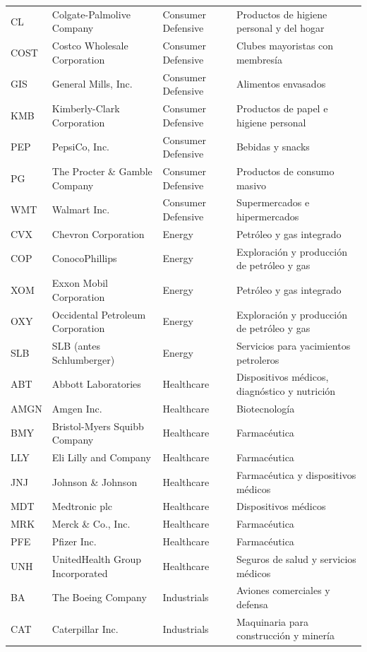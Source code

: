 \documentclass[12pt,letterpaper,oneside]{report}
\renewcommand{\_}{\UnderscoreOriginal\allowbreak}
\begin{document}
{\begin{longtable}{@{}l>{\raggedright}p{4.1cm}>{\raggedright}p{3.1cm}>{\raggedright\arraybackslash}p{5.3cm}@{}}
CL & Colgate-Palmolive Company & Consumer Defensive & Productos de higiene personal y del hogar \\
COST & Costco Wholesale Corporation & Consumer Defensive & Clubes mayoristas con membresía \\
GIS & General Mills, Inc. & Consumer Defensive & Alimentos envasados \\
KMB & Kimberly-Clark Corporation & Consumer Defensive & Productos de papel e higiene personal \\
PEP & PepsiCo, Inc. & Consumer Defensive & Bebidas y snacks \\
PG & The Procter \& Gamble Company & Consumer Defensive & Productos de consumo masivo \\
WMT & Walmart Inc. & Consumer Defensive & Supermercados e hipermercados \\
CVX & Chevron Corporation & Energy & Petróleo y gas integrado \\
COP & ConocoPhillips & Energy & Exploración y producción de petróleo y gas \\
XOM & Exxon Mobil Corporation & Energy & Petróleo y gas integrado \\
OXY & Occidental Petroleum Corporation & Energy & Exploración y producción de petróleo y gas \\
SLB & SLB (antes Schlumberger) & Energy & Servicios para yacimientos petroleros \\
ABT & Abbott Laboratories & Healthcare & Dispositivos médicos, diagnóstico y nutrición \\
AMGN & Amgen Inc. & Healthcare & Biotecnología \\
BMY & Bristol-Myers Squibb Company & Healthcare & Farmacéutica \\
LLY & Eli Lilly and Company & Healthcare & Farmacéutica \\
JNJ & Johnson \& Johnson & Healthcare & Farmacéutica y dispositivos médicos \\
MDT & Medtronic plc & Healthcare & Dispositivos médicos \\
MRK & Merck \& Co., Inc. & Healthcare & Farmacéutica \\
PFE & Pfizer Inc. & Healthcare & Farmacéutica \\
UNH & UnitedHealth Group Incorporated & Healthcare & Seguros de salud y servicios médicos \\
BA & The Boeing Company & Industrials & Aviones comerciales y defensa \\
CAT & Caterpillar Inc. & Industrials & Maquinaria para construcción y minería \\

\end{longtable}}
\end{document}
